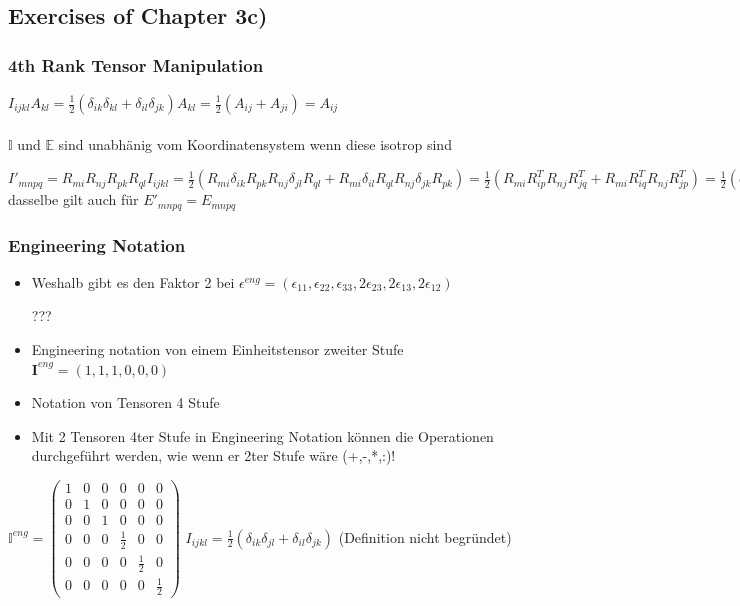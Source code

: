 \documentclass[a4paper]{scrartcl}
\begin{document}
\subsection{Exercises of Chapter 3c)}

\subsubsection{4th Rank Tensor Manipulation}


$I_{ijkl}A_{kl}=\frac{1}{2}(\delta_{ik}\delta_{kl}+\delta_{il}\delta_{jk})A_{kl}=\frac{1}{2}(A_{ij}+A_{ji})=A_{ij}$
\\
\\
$ \mathbb{I} $ und $ \mathbb{E} $ sind unabhänig vom Koordinatensystem wenn diese isotrop sind

$ I'_{mnpq}=R_{mi}R_{nj}R_{pk}R_{ql}I_{ijkl} = \frac{1}{2}(R_{mi}\delta_{ik}R_{pk}R_{nj}\delta_{jl}R_{ql} + R_{mi}\delta_{il}R_{ql}R_{nj}\delta_{jk}R_{pk})= \frac{1}{2}(R_{mi}R^T_{ip}R_{nj}R^T_{jq}+R_{mi}R^T_{iq}R_{nj}R^T_{jp})= \frac{1}{2}(\delta_{mp}\delta_{mq}\delta_{np})=I_{mnpq} $ dasselbe gilt auch für $ E'_{mnpq}=E_{mnpq}$


\subsubsection{Engineering Notation}
\begin{itemize}
\item Weshalb gibt es den Faktor 2 bei $ \epsilon^{eng}=(\epsilon_{11},\epsilon_{22},\epsilon_{33},2\epsilon_{23},2\epsilon_{13},2\epsilon_{12}) $

???


\item Engineering notation von einem Einheitstensor zweiter Stufe
$ \textbf{I}^{eng}=(1,1,1,0,0,0) $


\item Notation von Tensoren 4 Stufe
\item Mit 2 Tensoren 4ter Stufe in Engineering Notation können die Operationen
durchgeführt werden, wie wenn er 2ter Stufe wäre (+,-,*,:)!

\end{itemize}
$ \mathbb{I}^{eng}=
\begin{pmatrix}
1 & 0 & 0 & 0 & 0 & 0 \\ 
0 & 1 & 0 & 0 & 0 & 0 \\ 
0 & 0 & 1 & 0 & 0 & 0 \\ 
0 & 0 & 0 & \frac{1}{2} & 0 & 0 \\ 
0 & 0 & 0 & 0 & \frac{1}{2} & 0 \\ 
0 & 0 & 0 & 0 & 0 & \frac{1}{2}
\end{pmatrix} 
$ $I_{ijkl} = \frac{1}{2} (\delta_{ik} \delta_{jl} + \delta_{il} \delta_{jk}) $
(Definition nicht begründet)
\end{document}
